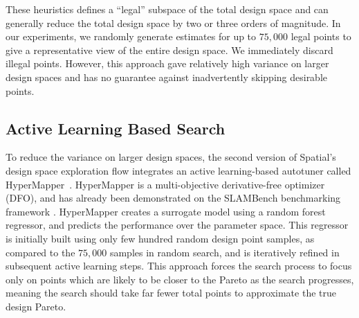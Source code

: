 These heuristics defines a ``legal'' subspace of the total design space and can
generally reduce the total design space by two or three orders of magnitude.
In our experiments, we randomly generate estimates for up to $75,000$ legal
points to give a representative view of the entire design space. We immediately
discard illegal points. However, this approach gave relatively high variance
on larger design spaces and has no guarantee against inadvertently skipping desirable points.

\subsection{Active Learning Based Search}
To reduce the variance on larger design spaces, the second version of
Spatial's design space exploration flow integrates an active learning-based autotuner called HyperMapper~\cite{Bodin2016:PACT16,NardiBSVDK17,Saeedi_ICRA_2017}.
HyperMapper is a multi-objective derivative-free optimizer (DFO), and has already been demonstrated on the SLAMBench benchmarking framework \cite{nardi2015introducing}.
HyperMapper creates a surrogate model using a random forest regressor,
and predicts the performance over the parameter space.
This regressor is initially built using only few hundred random design point
samples, as compared to the $75,000$ samples in random search,
and is iteratively refined in subsequent active learning steps. This approach
forces the search process to focus only on points which are likely to be closer to the
Pareto as the search progresses, meaning the search should take far fewer total
points to approximate the true design Pareto.
